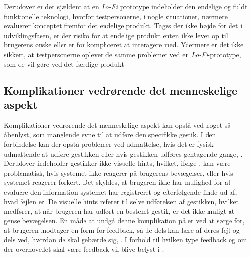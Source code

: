 Derudover er det sjældent at en \textit{Lo-Fi} prototype indeholder den endelige og fuldt funktionelle teknologi, hvorfor testpersonerne, i nogle situationer, nærmere evaluerer konceptet fremfor det endelige produkt. Tages der ikke højde for det i udviklingsfasen, er der risiko for at endelige produkt enten ikke lever op til brugerens ønske eller er for kompliceret at interagere med. Ydermere er det ikke sikkert, at testpersonerne oplever de samme problemer ved en \textit{Lo-Fi}-prototype, som de vil gøre ved det færdige produkt.   
%
\subsection{Komplikationer vedrørende det menneskelige aspekt}
\label{KomplikationerVedroerendeDetMenneskelige}
%
Komplikationer vedrørende det menneskelige aspekt kan opstå ved noget så åbenlyst, som manglende evne til at udføre den specifikke gestik. I den forbindelse kan der opstå problemer ved udmattelse, hvis det er fysisk udmattende at udføre gestikken eller hvis gestikken udføres gentagende gange, \parencite[s. 28]{PDF:ATaxonomyOfGestures}. Derudover indeholder gestikker ikke visuelle hints, hvilket, ifølge \textcite[s. 6]{PDF:NaturalUserInterfaces}, kan være problematisk, hvis systemet ikke reagerer på brugerens bevægelser, eller hvis systemet reagerer forkert. Det skyldes, at brugeren ikke har mulighed for at evaluere den information systemet har registreret og efterfølgende finde ud af, hvad fejlen er. De visuelle hints referer til selve udførelsen af gestikken, hvilket medfører, at når brugeren har udført en bestemt gestik, er det ikke muligt at gense bevægelsen. En måde at undgå denne komplikation på er ved at sørge for, at brugeren modtager en form for feedback, så de dels kan lære af deres fejl og dels ved, hvordan de skal gebærde sig, \parencite[s. 10]{PDF:NaturalUserInterfaces}. I forhold til hvilken type feedback og om der overhovedet skal være feedback vil blive belyst i . \blankline
%

